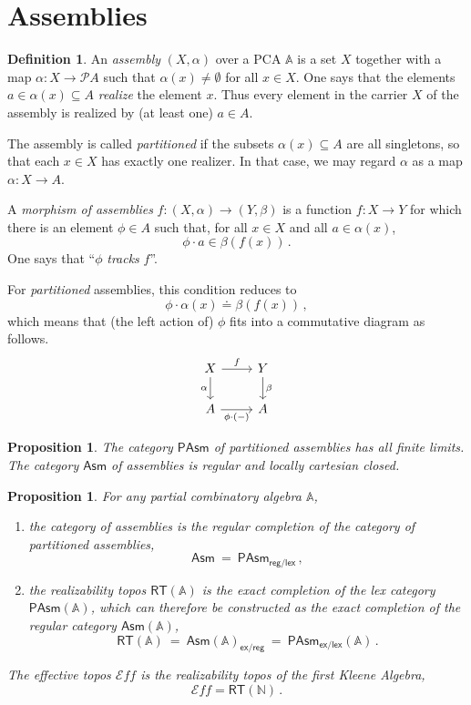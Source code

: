 \documentclass[12pt]{article}
\newcommand{\kleq}{\doteq}
\newcommand{\A}{\ensuremath{\mathbb{A}}}
\newcommand{\N}{\ensuremath{\mathbb{N}}}
\newcommand{\EE}{\ensuremath{\mathcal{E}}}
\newcommand{\PP}{\ensuremath{\mathcal{P}}}
\renewcommand{\to}{\ensuremath{\rightarrow}}
\newtheorem{proposition}[theorem]{Proposition}
\theoremstyle{remark}
\theoremstyle{definition}
\newtheorem{definition}[theorem]{Definition}
\begin{document}
\section{Assemblies}

\begin{definition}
  An \emph{assembly} $(X, \alpha)$ over a PCA $\A$ is a set $X$ together with a map $\alpha : X \to \PP{A}$ such that $\alpha(x) \neq\emptyset$ for all $x\in X$. One says that the elements $a\in \alpha(x)\subseteq A$  \emph{realize} the element $x$.  Thus every element in the carrier $X$ of the assembly is realized by (at least one) $a\in A$. 
  
The assembly is called \emph{partitioned} if  the subsets $\alpha(x)\subseteq A$ are all singletons, so that each $x\in X$ has exactly one realizer.  In that case, we may regard $\alpha$ as a map $\alpha : X \to A$.

A \emph{morphism of assemblies} $f : (X, \alpha) \to (Y, \beta)$ is a function $f : X \to Y$ for which there is an element $\phi\in A$ such that, for all $x\in X$ and all $a\in \alpha(x)$, 
\[
\phi\cdot a \in \beta(f(x))\,.
\]
One says that ``$\phi$ \emph{tracks} $f$''.
\end{definition}

For \emph{partitioned} assemblies, this condition reduces to 
\[
\phi \cdot \alpha(x) \kleq \beta(f(x)) \,,
\]
which means that (the left action of) $\phi$ fits into a commutative diagram as follows.
\[
\begin{tikzcd}
X \ar[d, swap,"\alpha"]  \ar[r,"f"] & Y \ar[d, "\beta"] \\  
A \ar[r,swap,"{\phi\cdot(-)}"] & A	
 \end{tikzcd}
 \]

\begin{proposition}
The category $\mathsf{PAsm}$ of partitioned assemblies has all finite limits. The category $\mathsf{Asm}$ of assemblies is regular and locally cartesian closed.
\end{proposition}

\begin{proposition} For any partial combinatory algebra $\A$,
\begin{enumerate}
\item
the category of assemblies is the regular completion of the category of partitioned assemblies,
\[
\mathsf{Asm} \ =\ \mathsf{PAsm}_{\mathsf{reg/lex}}\,,
\]
\item the \emph{realizability topos} $\mathsf{RT}(\A)$ is the exact completion of the lex category $\mathsf{PAsm}(\A)$, which can therefore be constructed as the exact completion of the regular category $\mathsf{Asm}(\A)$,
\[
\mathsf{RT(\A)}\ =\ \mathsf{Asm}(\A)_{\mathsf{ex/reg}} \ =\ \mathsf{PAsm}_{\mathsf{ex/lex}}(\A)\,.
\]
\end{enumerate}
The \emph{effective topos} ${\EE}{\!f\!f}$ is the realizability topos of the first Kleene Algebra, 
\[
{\EE}{\!f\!f} = \mathsf{RT(\N)}\,.
\]
\end{proposition}





\end{document}
